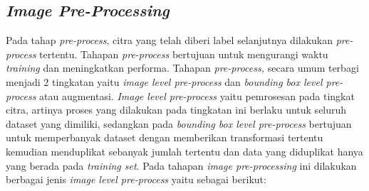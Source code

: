 \subsection{\textit{Image Pre-Processing}}
\label{subsec:imagepreprocess}
Pada tahap \textit{pre-process}, citra yang telah diberi label selanjutnya dilakukan \textit{pre-process} tertentu. Tahapan \textit{pre-process} bertujuan untuk mengurangi waktu \textit{training} dan meningkatkan performa. Tahapan \textit{pre-process,} secara umum terbagi menjadi 2 tingkatan yaitu \textit{image level pre-process} dan \textit{bounding box level pre-process} atau augmentasi. \textit{Image level pre-process} yaitu pemrosesan pada tingkat citra, artinya proses yang dilakukan pada tingkatan ini berlaku untuk seluruh dataset yang dimiliki, sedangkan pada \textit{bounding box level pre-process} bertujuan untuk memperbanyak dataset dengan memberikan transformasi tertentu kemudian menduplikat sebanyak jumlah tertentu dan data yang diduplikat hanya yang berada pada \textit{training set}. Pada tahapan \textit{image pre-processing} ini dilakukan berbagai jenis \textit{image level pre-process} yaitu sebagai berikut: \par
